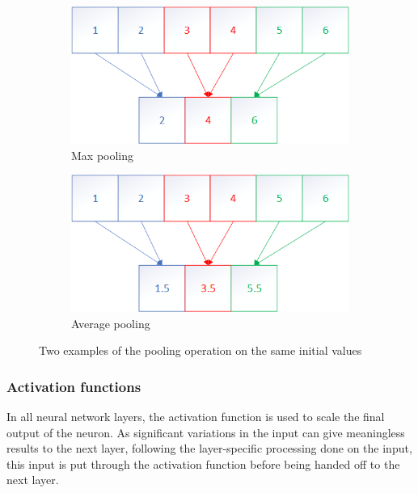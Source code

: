 \begin{figure}
    \centering
    \begin{subfigure}[b]{.45\textwidth}
        \centering
        \includegraphics[width=\textwidth]{figures/maxpooling.png}
        \caption{Max pooling}
        \label{sfig:maxpoolexample}
    \end{subfigure}
    \hfill
    \begin{subfigure}[b]{.45\textwidth}
        \centering
        \includegraphics[width=\textwidth]{figures/avgpooling.png}
        \caption{Average pooling}
        \label{sfig:avgpoolexample}
    \end{subfigure}
    \caption{Two examples of the pooling operation on the same initial values}
    \label{fig:poolexample}
\end{figure}

\subsubsection{Activation functions}
In all neural network layers, the activation function is used to scale the final output of the neuron.
As significant variations in the input can give meaningless results to the next layer, following the layer-specific processing done on the input, this input is put through the activation function before being handed off to the next layer.


